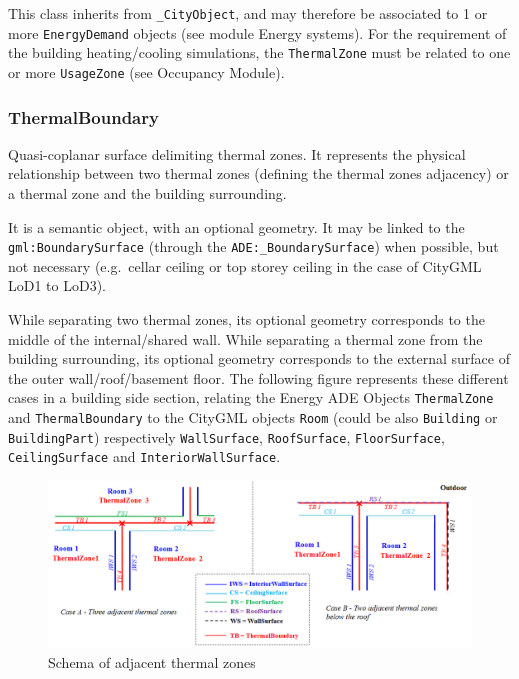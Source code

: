 \documentclass[a4paper,12pt]{article}
\begin{document}
This class inherits from \texttt{\_CityObject}, and may therefore be
associated to 1 or more \texttt{EnergyDemand} objects (see module Energy
systems). For the requirement of the building heating/cooling
simulations, the \texttt{ThermalZone} must be related to one or more
\texttt{UsageZone} (see Occupancy Module).

\subsubsection{ThermalBoundary}\label{thermalboundary}

Quasi-coplanar surface delimiting thermal zones. It represents the
physical relationship between two thermal zones (defining the thermal
zones adjacency) or a thermal zone and the building surrounding.

It is a semantic object, with an optional geometry. It may be linked to
the \texttt{gml:BoundarySurface} (through the
\texttt{ADE:\_BoundarySurface}) when possible, but not necessary
(e.g.~cellar ceiling or top storey ceiling in the case of CityGML LoD1
to LoD3).

While separating two thermal zones, its optional geometry corresponds to
the middle of the internal/shared wall. While separating a thermal zone
from the building surrounding, its optional geometry corresponds to the
external surface of the outer wall/roof/basement floor. The following
figure represents these different cases in a building side section,
relating the Energy ADE Objects \texttt{ThermalZone} and
\texttt{ThermalBoundary} to the CityGML objects \texttt{Room} (could be
also \texttt{Building} or \texttt{BuildingPart}) respectively
\texttt{WallSurface}, \texttt{RoofSurface}, \texttt{FloorSurface},
\texttt{CeilingSurface} and \texttt{InteriorWallSurface}.

\begin{figure}[htbp]
\centering
\includegraphics{fig/ThermalZoneAdjacency.png}
\caption{Schema of adjacent thermal zones}
\end{figure}
\end{document}
